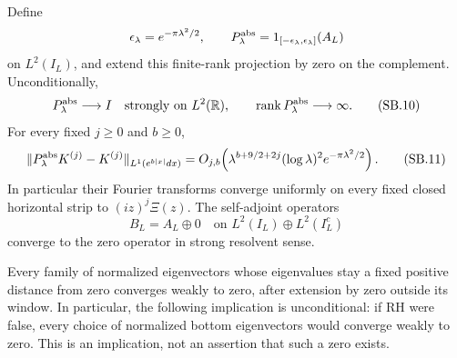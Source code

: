 \begin{theorem}
\label{AC-S24}
Define
\[
 \epsilon_\lambda=e^{-\pi\lambda^2/2},\qquad
 P_\lambda^{\rm abs}=1_{[-\epsilon_\lambda,\epsilon_\lambda]}(A_L)
\]
on \(L^2(I_L)\), and extend this finite-rank projection by zero
on the complement.  Unconditionally,
\[
 P_\lambda^{\rm abs}\longrightarrow I
       \quad\text{strongly on }L^2(\mathbb R),\qquad
 \operatorname{rank}P_\lambda^{\rm abs}\longrightarrow\infty .
                                                               \tag{SB.10}
\]
For every fixed \(j\geq0\) and \(b\geq0\),
\[
 \|P_\lambda^{\rm abs}K^{(j)}-K^{(j)}\|_{L^1(e^{b|x|}dx)}
 =O_{j,b}\!\left(
 \lambda^{b+9/2+2j}(\log\lambda)^2e^{-\pi\lambda^2/2}\right).
                                                               \tag{SB.11}
\]
In particular their Fourier transforms converge uniformly on every
fixed closed horizontal strip to \((iz)^j\Xi(z)\).
The self-adjoint operators
\[
 B_L=A_L\oplus0\quad\text{on }
        L^2(I_L)\oplus L^2(I_L^c)
\]
converge to the zero operator in strong resolvent sense.

Every family of normalized eigenvectors whose eigenvalues stay a
fixed positive distance from zero converges weakly to zero, after
extension by zero outside its window.  In particular, the following
implication is unconditional: if RH were false, every choice of
normalized bottom eigenvectors would converge weakly to zero.
This is an implication, not an assertion that such a zero exists.
\end{theorem}

